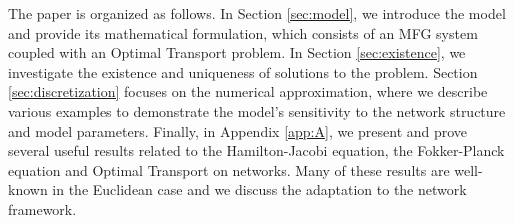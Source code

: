\documentclass[smallextended,referee,envcountsect,]{svjour3}
\begin{document}
The paper is organized as follows. In Section \ref{sec:model}, we introduce the model and provide its mathematical formulation, which consists of an MFG system coupled with an Optimal Transport problem. In Section \ref{sec:existence}, we investigate the existence and uniqueness of solutions to the problem. Section \ref{sec:discretization} focuses on the numerical approximation, where we describe various examples to demonstrate the model's sensitivity to the network structure and model parameters. Finally, in Appendix \ref{app:A}, we present and prove several useful results related to the Hamilton-Jacobi equation, the Fokker-Planck equation and Optimal Transport on networks. Many of these results are well-known in the Euclidean case and we discuss the adaptation to the network framework.

\end{document}
